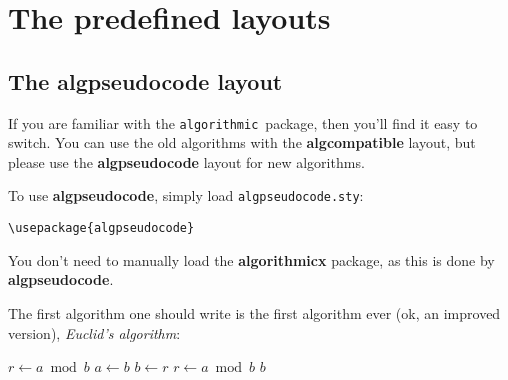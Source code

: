 \documentclass{jsarticle}
\newcommand{\old}{\texttt{algorithmic}}
\newcommand{\euk}{Euclid}
\begin{document}
\section{The predefined layouts}

\subsection{The \textbf{algpseudocode} layout}\label{algpseudocode}
If you are familiar with the \old\ package, then you'll find it easy to 
switch. You can use the old algorithms with the \textbf{algcompatible} layout, but please
use the \textbf{algpseudocode} layout for new algorithms.

To use \textbf{algpseudocode}, simply load \verb:algpseudocode.sty::

\begin{verbatim}
\usepackage{algpseudocode}
\end{verbatim}

You don't need to manually load the \textbf{algorithmicx} package, as this is done by
\textbf{algpseudocode}.

The first algorithm one should write is the first algorithm ever (ok, 
an improved version), \textit{\euk's algorithm}:

\begin{algorithm}[H]
\caption{\euk's algorithm}\label{euclid}
\begin{algorithmic}[1]
\Procedure{\euk}{$a,b$}
   \State $r\gets a\bmod b$
      \State $a\gets b$
      \State $b\gets r$
      \State $r\gets a\bmod b$
   \EndWhile\label{euclidendwhile}
   \State \Return $b$
\EndProcedure
\end{algorithmic}
\end{algorithm}
\end{document}
